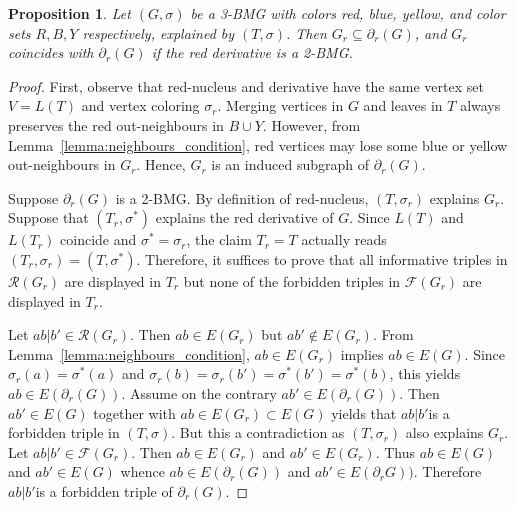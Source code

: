 \documentclass[final,3p,times]{elsarticle}
\newtheorem{proposition}[theorem]{Proposition}%
\begin{document}
\begin{proposition}
\label{prop:nucleus2BMG}
Let $(G,\sigma)$ be a 3-BMG with colors red, blue, yellow, and color sets $R,B,Y$ respectively, explained by $(T,\sigma)$. Then $G_r\subseteq \partial_r(G)$, and $G_r$ coincides with $\partial_r(G)$ if the red derivative is a 2-BMG.
\end{proposition}
\begin{proof}
First, observe that red-nucleus and derivative have the same vertex set $V=L(T)$ and vertex coloring $\sigma_r$. Merging vertices in $G$ and leaves in $T$ always preserves the red out-neighbours in $B\cup Y$. However, from Lemma~\ref{lemma:neighbours_condition}, red vertices may lose some blue or yellow out-neighbours in $G_r$. Hence, $G_r$ is an induced subgraph of $\partial_r(G)$.

Suppose $\partial_r(G)$ is a 2-BMG. By definition of red-nucleus, $(T,\sigma_r)$ explains $G_r$. Suppose that $(T_r,\sigma^*)$ explains the red derivative of $G$.
Since $L(T)$ and $L(T_r)$ coincide and $\sigma^*=\sigma_r$, the claim $T_r=T$ actually reads $(T_r,\sigma_r)=(T, \sigma^*)$. Therefore, it suffices to prove that all informative triples in $\mathscr{R}(G_r)$ are displayed in $T_r$ but none of the forbidden triples in $\mathscr{F}(G_r)$ are displayed in $T_r$.

Let $ab|b'\in \mathscr{R}(G_r)$. Then $ab\in E(G_r)$ but $ab'\not\in E(G_r)$. From Lemma~\ref{lemma:neighbours_condition}, $ab\in E(G_r)$ implies $ab\in E(G)$. Since $\sigma_r(a)=\sigma^*(a)$ and $\sigma_r(b)=\sigma_r(b')=\sigma^*(b')=\sigma^*(b)$, this yields
$ab\in E(\partial_r(G))$. Assume on the contrary $ab'\in E(\partial_r(G))$. Then $ab'\in E(G)$ together with $ab\in E(G_r)\subset E(G)$ yields that $ab|b'$is a forbidden triple in $(T,\sigma)$. But this a contradiction as $(T,\sigma_r)$ also explains $G_r$.
Let $ab|b'\in\mathscr{F}(G_r)$. Then $ab\in E(G_r)$ and $ab'\in E(G_r)$. Thus $ab\in E(G)$ and $ab'\in E(G)$ whence $ab\in E(\partial_r(G))$ and $ab'\in E(\partial_rG))$. Therefore $ab|b'$is a forbidden triple of $\partial_r(G)$.
\end{proof}
\end{document}
